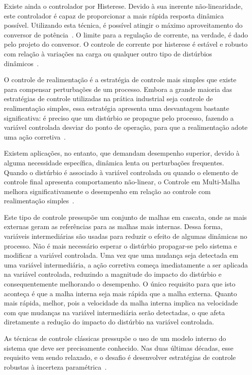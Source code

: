 	Existe ainda o controlador por Histerese. Devido à sua inerente não-linearidade,
	este controlador é capaz de proporcionar a mais rápida resposta dinâmica possível.
	Utilizando esta técnica, é possível atingir o máximo aproveitamento do conversor
	de potência~\cite{ref:YAO}. O limite para a regulação de corrente, na verdade,
	é dado pelo projeto do conversor. O controle de corrente por histerese é estável
	e robusto com relação à variações na carga ou qualquer outro tipo de distúrbios
	dinâmicos~\cite{ref:TENTI}.

	O controle de realimentação é a estratégia de controle mais simples que existe
	para compensar perturbações de um processo. Embora a grande maioria das estratégias
	de controle utilizadas na prática industrial seja controle de realimentação simples,
	essa estratégia apresenta uma desvantagem bastante significativa: é preciso que
	um distúrbio se propague pelo processo, fazendo a variável controlada desviar
	do ponto de operação, para que a realimentação adote uma ação corretiva~\cite{ref:SMITH}.

	Existem aplicações, no entanto, que demandam desempenho superior, devido à alguma
	necessidade específica, dinâmica lenta ou perturbações frequentes. Quando o distúrbio
	é associado à variável controlada ou quando o elemento de controle final apresenta
	comportamento não-linear, o Controle em Multi-Malha melhora significativamente o
	desempenho em relação ao controle com realimentação simples~\cite{ref:KRISHNA}.

	Este tipo de controle pressupõe um conjunto de malhas em cascata, onde as mais
	externas geram as referências para as malhas mais internas. Dessa forma, variáveis
	intermediárias são usadas para reduzir o efeito de algumas dinâmicas no processo.
	Não é mais necessário esperar o distúrbio propagar-se pelo sistema e modificar a
	variável controlada. Uma vez que uma mudança seja detectada em uma variável
	intermediária, a ação corretiva começa imediatamente a ser aplicada na variável
	controlada, reduzindo a magnitude do impacto do distúrbio e consequentemente
	melhorando o desempenho. O único requisito para que isto aconteça é que a malha
	interna seja mais rápida que a malha externa. Quanto mais rápida, melhor, pois
	a velocidade da malha interna implica na velocidade com que mudanças na variável
	intermediária serão detectadas, o que afeta diretamente a redução do impacto
	do distúrbio na variável controlada.

	As técnicas de controle clássicas pressupõe o uso de um modelo interno do sistema
	que deve ser precisamente conhecido. Nas duas últimas décadas, esse requisito
	vem sendo relaxado, e o desafio é desenvolver estratégias de controle robustas
	à incerteza paramétrica~\cite{ref:GEROMEL}.

